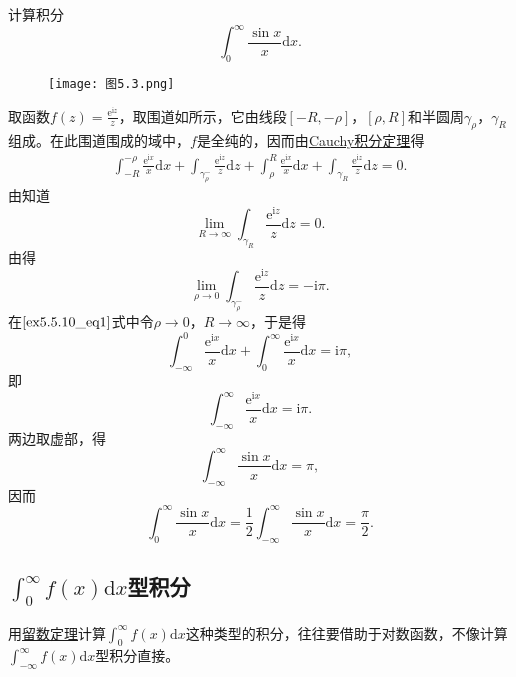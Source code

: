 \documentclass[../../main.tex]{subfiles}
\begin{document}
\begin{example}
计算积分
\[
\int_{0}^{\infty} \frac{\sin x}{x} \mathrm{d}x.
\]
\end{example}
\begin{figure}[H]
\centering
\texttt{[image: 图5.3.png]}
\caption{}
\label{figure:图5.3}
\end{figure}
\begin{solution}
取函数\( f(z) = \frac{\mathrm{e}^{\mathrm{i}z}}{z} \)，取围道如所示，它由线段\([-R, -\rho]\)，\([\rho, R]\)和半圆周\(\gamma_{\rho}\)，\(\gamma_R\)组成。在此围道围成的域中，\( f \)是全纯的，因而由\hyperref[theorem:Cauchy-Goursat定理(Cauchy积分定理)]{Cauchy积分定理}得
\begin{align}
\int_{-R}^{-\rho} \frac{\mathrm{e}^{\mathrm{i}x}}{x} \mathrm{d}x + \int_{\gamma_{\rho}^{-}} \frac{\mathrm{e}^{\mathrm{i}z}}{z} \mathrm{d}z + \int_{\rho}^{R} \frac{\mathrm{e}^{\mathrm{i}x}}{x} \mathrm{d}x + \int_{\gamma_R} \frac{\mathrm{e}^{\mathrm{i}z}}{z} \mathrm{d}z = 0. \label{ex5.5.10_eq1}
\end{align}
由知道
\[
\lim_{R \to \infty} \int_{\gamma_R} \frac{\mathrm{e}^{\mathrm{i}z}}{z} \mathrm{d}z = 0.
\]
由得
\[
\lim_{\rho \to 0} \int_{\gamma_{\rho}^{-}} \frac{\mathrm{e}^{\mathrm{i}z}}{z} \mathrm{d}z = -\mathrm{i}\pi.
\]
在\(\eqref{ex5.5.10_eq1}\)式中令\(\rho \to 0\)，\( R \to \infty \)，于是得
\[
\int_{-\infty}^{0} \frac{\mathrm{e}^{\mathrm{i}x}}{x} \mathrm{d}x + \int_{0}^{\infty} \frac{\mathrm{e}^{\mathrm{i}x}}{x} \mathrm{d}x = \mathrm{i}\pi,
\]
即
\[
\int_{-\infty}^{\infty} \frac{\mathrm{e}^{\mathrm{i}x}}{x} \mathrm{d}x = \mathrm{i}\pi.
\]
两边取虚部，得
\[
\int_{-\infty}^{\infty} \frac{\sin x}{x} \mathrm{d}x = \pi,
\]
因而
\[
\int_{0}^{\infty} \frac{\sin x}{x} \mathrm{d}x = \frac{1}{2} \int_{-\infty}^{\infty} \frac{\sin x}{x} \mathrm{d}x
= \frac{\pi}{2}.
\]
\end{solution}

\subsection{$\int_0^{\infty}{f\left( x \right) \mathrm{d}x}$型积分}

用\hyperref[theorem:留数定理(残数定理)-定理5.4.9]{留数定理}计算\(\int_{0}^{\infty} f(x) \mathrm{d}x\)这种类型的积分，往往要借助于对数函数，不像计算\(\int_{-\infty}^{\infty} f(x) \mathrm{d}x\)型积分直接。
\end{document}
